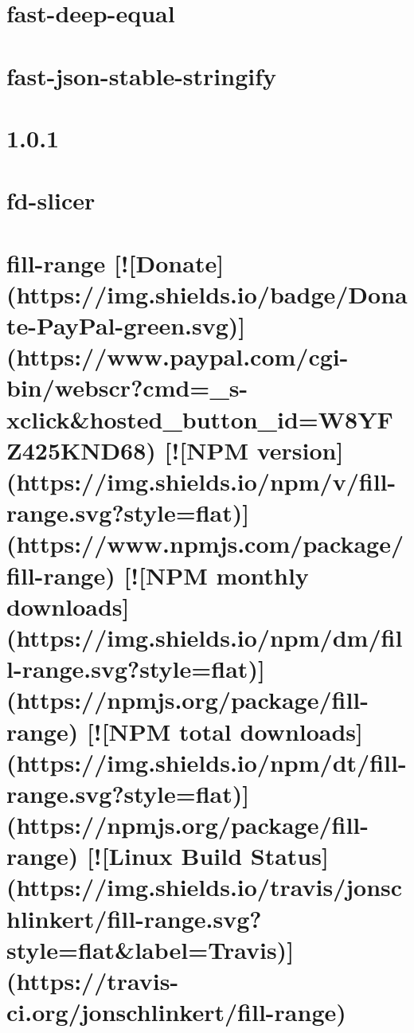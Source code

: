 \documentclass[twoside]{book}
\newcommand{\+}{\discretionary{\mbox{\scriptsize$\hookleftarrow$}}{}{}}
\begin{document}
\chapter{fast-\/deep-\/equal}
\label{md_dsmacc_examples_DRmerge_node_modules_fast-deep-equal_README}

\chapter{fast-\/json-\/stable-\/stringify}
\label{md_dsmacc_examples_DRmerge_node_modules_fast-json-stable-stringify_README}

\chapter{1.0.1}
\label{md_dsmacc_examples_DRmerge_node_modules_fd-slicer_CHANGELOG}

\chapter{fd-\/slicer}
\label{md_dsmacc_examples_DRmerge_node_modules_fd-slicer_README}

\chapter{fill-\/range \mbox{[}!\mbox{[}Donate\mbox{]}(https\+://img.shields.\+io/badge/\+Donate-\/\+Pay\+Pal-\/green.svg)\mbox{]}(https\+://www.paypal.\+com/cgi-\/bin/webscr?cmd=\+\_\+s-\/xclick\&hosted\+\_\+button\+\_\+id=W8\+Y\+F\+Z425\+K\+N\+D68) \mbox{[}!\mbox{[}N\+PM version\mbox{]}(https\+://img.shields.\+io/npm/v/fill-\/range.svg?style=flat)\mbox{]}(https\+://www.npmjs.\+com/package/fill-\/range) \mbox{[}!\mbox{[}N\+PM monthly downloads\mbox{]}(https\+://img.shields.\+io/npm/dm/fill-\/range.svg?style=flat)\mbox{]}(https\+://npmjs.org/package/fill-\/range) \mbox{[}!\mbox{[}N\+PM total downloads\mbox{]}(https\+://img.shields.\+io/npm/dt/fill-\/range.svg?style=flat)\mbox{]}(https\+://npmjs.org/package/fill-\/range) \mbox{[}!\mbox{[}Linux Build Status\mbox{]}(https\+://img.shields.\+io/travis/jonschlinkert/fill-\/range.svg?style=flat\&label=Travis)\mbox{]}(https\+://travis-\/ci.org/jonschlinkert/fill-\/range)}
\label{md_dsmacc_examples_DRmerge_node_modules_fill-range_README}

\end{document}
